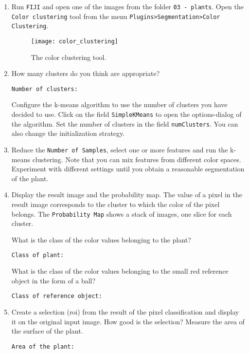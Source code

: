 \begin{enumerate}
\item Run {\tt FIJI} and open one of the images from the folder {\tt 03 - plants}. Open the {\tt Color clustering} tool from the menu {\tt Plugins>Segmentation>Color Clustering}.
\begin{figure}[!htb]
 \centering
 \texttt{[image: color\_clustering]}
 \caption{The color clustering tool.}
 \label{figure:color_clustering}
\end{figure}
\item How many clusters do you think are appropriate? 
\begin{verbatim}
Number of clusters:

\end{verbatim}
Configure the k-means algorithm to use the number of clusters you have decided to use. Click on the field {\tt SimpleKMeans} to open the options-dialog of the algorithm. Set the number of clusters in the field {\tt numClusters}. You can also change the initialization strategy.

\item Reduce the {\tt Number of Samples}, select one or more features and run the k-means clustering. Note that you can mix features from different color spaces. Experiment with different settings until you obtain a reasonable segmentation of the plant.

\item 
Display the result image and the probability map. The value of a pixel in the result image corresponds to the cluster to which the color of the pixel belongs. The {\tt Probability Map} shows a stack of images, one slice for each cluster. 

What is the class of the color values belonging to the plant?
\begin{verbatim}
Class of plant:

\end{verbatim}
What is the class of the color values belonging to the small red reference object in the form of a ball?
\begin{verbatim}
Class of reference object:

\end{verbatim}

\item Create a selection (roi) from the result of the pixel classification and display it on the original input image. How good is the selection? Measure the area of the surface of the plant.
\begin{verbatim}
Area of the plant:


\end{verbatim}
\end{enumerate}
